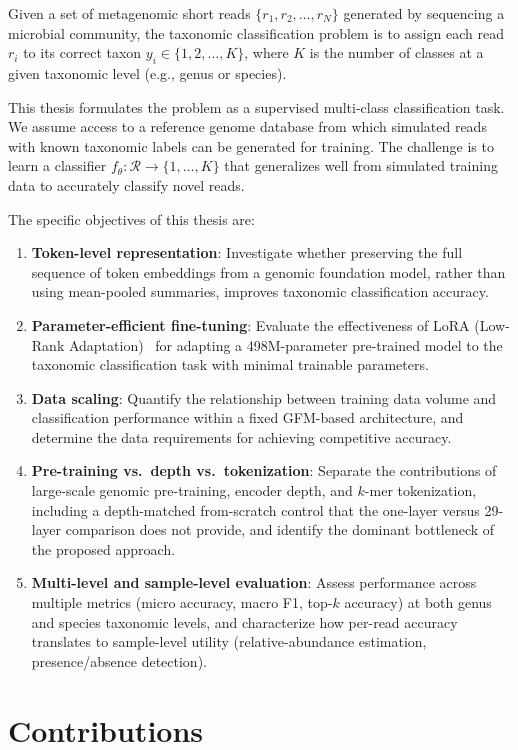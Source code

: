 Given a set of metagenomic short reads $\{r_1, r_2, \ldots, r_N\}$ generated by sequencing a microbial community, the taxonomic classification problem is to assign each read $r_i$ to its correct taxon $y_i \in \{1, 2, \ldots, K\}$, where $K$ is the number of classes at a given taxonomic level (e.g., genus or species).

This thesis formulates the problem as a supervised multi-class classification task. We assume access to a reference genome database from which simulated reads with known taxonomic labels can be generated for training. The challenge is to learn a classifier $f_\theta: \mathcal{R} \rightarrow \{1, \ldots, K\}$ that generalizes well from simulated training data to accurately classify novel reads.

The specific objectives of this thesis are:
\begin{enumerate}
    \item \textbf{Token-level representation}: Investigate whether preserving the full sequence of token embeddings from a genomic foundation model, rather than using mean-pooled summaries, improves taxonomic classification accuracy.
    \item \textbf{Parameter-efficient fine-tuning}: Evaluate the effectiveness of LoRA (Low-Rank Adaptation)~\cite{Hu2022} for adapting a 498M-parameter pre-trained model to the taxonomic classification task with minimal trainable parameters.
    \item \textbf{Data scaling}: Quantify the relationship between training data volume and classification performance within a fixed GFM-based architecture, and determine the data requirements for achieving competitive accuracy.
    \item \textbf{Pre-training vs.\ depth vs.\ tokenization}: Separate the contributions of large-scale genomic pre-training, encoder depth, and $k$-mer tokenization, including a depth-matched from-scratch control that the one-layer versus 29-layer comparison does not provide, and identify the dominant bottleneck of the proposed approach.
    \item \textbf{Multi-level and sample-level evaluation}: Assess performance across multiple metrics (micro accuracy, macro F1, top-$k$ accuracy) at both genus and species taxonomic levels, and characterize how per-read accuracy translates to sample-level utility (relative-abundance estimation, presence/absence detection).
\end{enumerate}

\section{Contributions}
\label{sec:intro-contributions}


